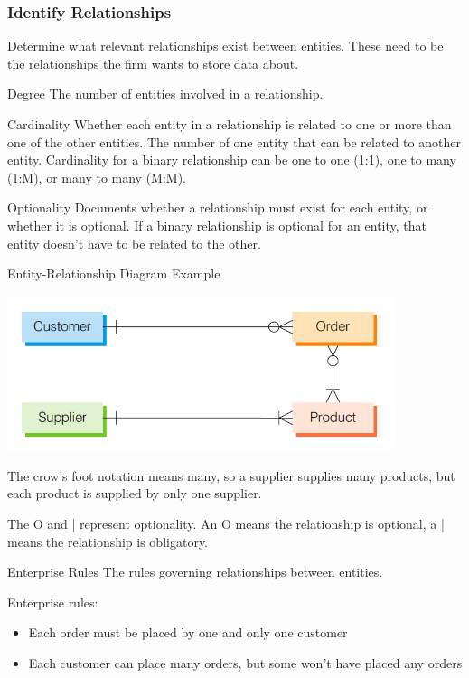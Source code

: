 \documentclass[\main/notes.tex]{subfiles}
\begin{document}
				\subsubsection{Identify Relationships}
					Determine what relevant relationships exist between entities. These need to be the relationships the firm wants to store data about.
					\begin{definition}{Degree}
						The number of entities involved in a relationship.
					\end{definition}
					\begin{definition}{Cardinality}
						Whether each entity in a relationship is related to one or more than one of the other entities. The number of one entity that can be related to another entity. Cardinality for a binary relationship can be one to one (1:1), one to many (1:M), or many to many (M:M).
					\end{definition}
					\begin{definition}{Optionality}
						Documents whether a relationship must exist for each entity, or whether it is optional. If a binary relationship is optional for an entity, that entity doesn't have to be related to the other.
					\end{definition}
					\begin{sidenote}{Entity-Relationship Diagram Example}
						\begin{center}
							\includegraphics[width=0.85\textwidth]{chapter05/entity_relationship_diagram.png}
						\end{center}
						The crow's foot notation means many, so a supplier supplies many products, but each product is supplied by only one supplier.

						The O and | represent optionality. An O means the relationship is optional, a | means the relationship is obligatory.
					\end{sidenote}
					\begin{definition}{Enterprise Rules}
						The rules governing relationships between entities.
					\end{definition}
					\begin{example}
						Enterprise rules:
						\begin{itemize}
							\item Each order must be placed by one and only one customer
							\item Each customer can place many orders, but some won't have placed any orders
						\end{itemize}
					\end{example}
\end{document}
